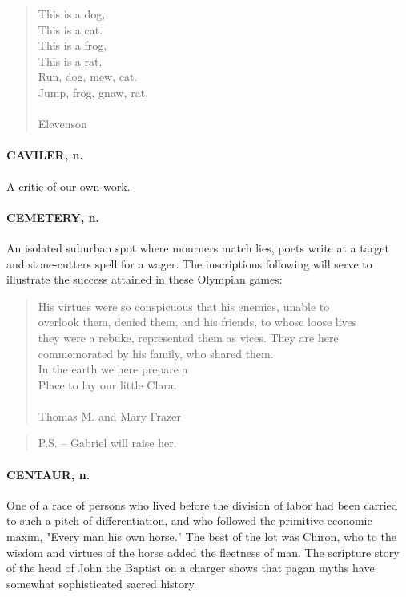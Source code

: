 \documentclass[11pt]{article}
\begin{document}
\begin{quote}   This is a dog, \\
      This is a cat. \\
  This is a frog, \\
      This is a rat. \\
  Run, dog, mew, cat. \\
  Jump, frog, gnaw, rat. \\
 \\
Elevenson \end{quote}


\paragraph{CAVILER, n.}  A critic of our own work.

\paragraph{CEMETERY, n.}  An isolated suburban spot where mourners match lies,
poets write at a target and stone-cutters spell for a wager.  The
inscriptions following will serve to illustrate the success attained
in these Olympian games:

\begin{quote}       His virtues were so conspicuous that his enemies, unable to \\
  overlook them, denied them, and his friends, to whose loose lives \\
  they were a rebuke, represented them as vices.  They are here \\
  commemorated by his family, who shared them. \\
      In the earth we here prepare a \\
      Place to lay our little Clara. \\
 \\
Thomas M. and Mary Frazer \end{quote}

\begin{quote}       P.S. -- Gabriel will raise her.  \end{quote}

\paragraph{CENTAUR, n.}  One of a race of persons who lived before the division of
labor had been carried to such a pitch of differentiation, and who
followed the primitive economic maxim, "Every man his own horse."  The
best of the lot was Chiron, who to the wisdom and virtues of the horse
added the fleetness of man.  The scripture story of the head of John
the Baptist on a charger shows that pagan myths have somewhat
sophisticated sacred history.
\end{document}
